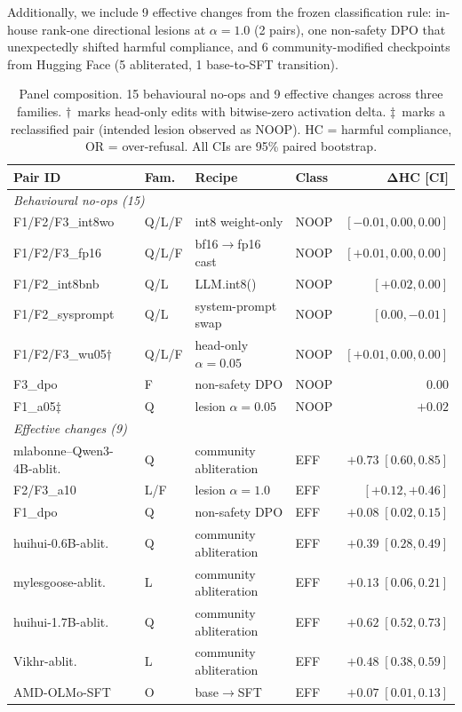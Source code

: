 \documentclass[11pt,letterpaper]{article}
\begin{document}
Additionally, we include 9 effective changes from the frozen classification rule: in-house rank-one directional lesions at $\alpha = 1.0$ (2 pairs), one non-safety DPO that unexpectedly shifted harmful compliance, and 6 community-modified checkpoints from Hugging Face (5 abliterated, 1 base-to-SFT transition).

\begin{table}[!htbp]
\centering
\scriptsize
\caption{Panel composition. 15 behavioural no-ops and 9 effective changes across three families. $\dagger$~marks head-only edits with bitwise-zero activation delta. $\ddagger$~marks a reclassified pair (intended lesion observed as NOOP). HC = harmful compliance, OR = over-refusal. All CIs are 95\% paired bootstrap.}
\label{tab:panel}
\begin{tabular}{llllr}
\toprule
\textbf{Pair ID} & \textbf{Fam.} & \textbf{Recipe} & \textbf{Class} & $\bm{\Delta}$\textbf{HC [CI]} \\
\midrule
\multicolumn{5}{l}{\textit{Behavioural no-ops (15)}} \\
F1/F2/F3\_int8wo & Q/L/F & int8 weight-only & NOOP & $[-0.01, 0.00, 0.00]$ \\
F1/F2/F3\_fp16   & Q/L/F & bf16$\to$fp16 cast & NOOP & $[+0.01, 0.00, 0.00]$ \\
F1/F2\_int8bnb   & Q/L   & LLM.int8()       & NOOP & $[+0.02, 0.00]$ \\
F1/F2\_sysprompt  & Q/L   & system-prompt swap & NOOP & $[0.00, -0.01]$ \\
F1/F2/F3\_wu05$\dagger$ & Q/L/F & head-only $\alpha{=}0.05$ & NOOP & $[+0.01, 0.00, 0.00]$ \\
F3\_dpo           & F     & non-safety DPO   & NOOP & $0.00$ \\
F1\_a05$\ddagger$ & Q     & lesion $\alpha{=}0.05$ & NOOP & $+0.02$ \\
\midrule
\multicolumn{5}{l}{\textit{Effective changes (9)}} \\
mlabonne--Qwen3-4B-ablit. & Q & community abliteration & EFF & $+0.73\;[0.60,0.85]$ \\
F2/F3\_a10 & L/F & lesion $\alpha{=}1.0$ & EFF & $[+0.12, +0.46]$ \\
F1\_dpo    & Q   & non-safety DPO & EFF & $+0.08\;[0.02,0.15]$ \\
huihui-0.6B-ablit. & Q & community abliteration & EFF & $+0.39\;[0.28,0.49]$ \\
mylesgoose-ablit.  & L & community abliteration & EFF & $+0.13\;[0.06,0.21]$ \\
huihui-1.7B-ablit. & Q & community abliteration & EFF & $+0.62\;[0.52,0.73]$ \\
Vikhr-ablit.       & L & community abliteration & EFF & $+0.48\;[0.38,0.59]$ \\
AMD-OLMo-SFT       & O & base$\to$SFT          & EFF & $+0.07\;[0.01,0.13]$ \\
\bottomrule
\end{tabular}
\end{table}
\end{document}

